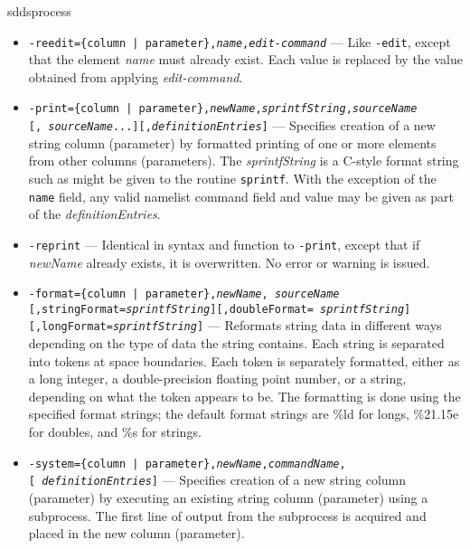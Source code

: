 \begin{sddsprog}{sddsprocess}
\begin{itemize}
\begin{itemize}
        If {\em sourceName} contains wildcards, then {\em newName} must contain at least one occurrence of the string
``\%s''.  In this case, for each name that matches {\em sourceName}, an additional element is created, with a
name created by substituting the name for ``\%s'' in {\em newName}.

         \item {\tt -reedit=\{column | parameter\},{\em name},{\em edit-command}} --- Like {\tt -edit},
except that the element {\em name} must already exist.  Each value is replaced by the value obtained from
applying {\em edit-command}.
         
        \item {\tt -print=\{column | parameter\},{\em newName},{\em sprintfString},{\em sourceName}}\\ {\tt [,{\em
sourceName}...][,{\em definitionEntries}]} --- Specifies creation of a new string column (parameter) by formatted
printing of one or more elements from other columns (parameters).  The {\em sprintfString} is a C-style format string
such as might be given to the routine {\tt sprintf}.  With the exception of the {\tt name} field, any valid namelist
command field and value may be given as part of the {\em definitionEntries}.

        \item {\tt -reprint} --- Identical in syntax and function to {\tt -print}, except that if {\em newName} 
already exists, it is overwritten.  No error or warning is issued.

        \item {\tt -format=\{column | parameter\},{\em newName},{\em
sourceName}} \\ {\tt [,stringFormat={\em sprintfString}][,doubleFormat={\em
sprintfString}]} \\ {\tt [,longFormat={\em sprintfString}]} --- Reformats string
data in different ways depending on the type of data the string
contains.  Each string is separated into tokens at space boundaries.
Each token is separately formatted, either as a long integer, a
double-precision floating point number, or a string, depending on what
the token appears to be.  The formatting is done using the specified
format strings; the default format strings are \%ld for longs,
\%21.15e for doubles, and \%s for strings.

         \item {\tt -system=\{column | parameter\},{\em newName},{\em commandName},}\\ {\tt [{\em
definitionEntries}]} --- Specifies creation of a new string column (parameter) by executing an existing string
column (parameter) using a subprocess.  The first line of output from the subprocess is acquired and placed in the
new column (parameter).


\end{itemize}
\end{itemize}
\end{sddsprog}
